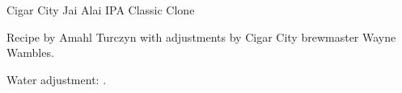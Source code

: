 \begin{recipe}{Cigar City Jai Alai IPA Classic Clone}

\begin{aboutblock}
Recipe by Amahl Turczyn with adjustments by Cigar City brewmaster Wayne
Wambles. 
\end{aboutblock}


\begin{methodandtiming}
 
\begin{mashsteps}
\end{mashsteps}

\begin{fermentationsteps}
\end{fermentationsteps}

\begin{directions}
Water adjustment: .
\end{directions}

\end{methodandtiming}

\recipebreak

\begin{ingredientsblock}

\begin{malts}
\end{malts}

\begin{hops}
\end{hops}


\end{ingredientsblock}

\end{recipe}

